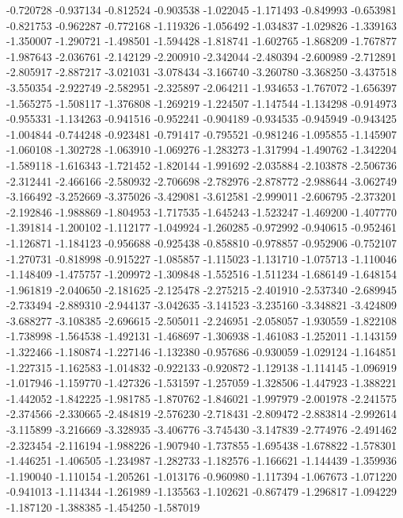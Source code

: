 -0.720728
-0.937134
-0.812524
-0.903538
-1.022045
-1.171493
-0.849993
-0.653981
-0.821753
-0.962287
-0.772168
-1.119326
-1.056492
-1.034837
-1.029826
-1.339163
-1.350007
-1.290721
-1.498501
-1.594428
-1.818741
-1.602765
-1.868209
-1.767877
-1.987643
-2.036761
-2.142129
-2.200910
-2.342044
-2.480394
-2.600989
-2.712891
-2.805917
-2.887217
-3.021031
-3.078434
-3.166740
-3.260780
-3.368250
-3.437518
-3.550354
-2.922749
-2.582951
-2.325897
-2.064211
-1.934653
-1.767072
-1.656397
-1.565275
-1.508117
-1.376808
-1.269219
-1.224507
-1.147544
-1.134298
-0.914973
-0.955331
-1.134263
-0.941516
-0.952241
-0.904189
-0.934535
-0.945949
-0.943425
-1.004844
-0.744248
-0.923481
-0.791417
-0.795521
-0.981246
-1.095855
-1.145907
-1.060108
-1.302728
-1.063910
-1.069276
-1.283273
-1.317994
-1.490762
-1.342204
-1.589118
-1.616343
-1.721452
-1.820144
-1.991692
-2.035884
-2.103878
-2.506736
-2.312441
-2.466166
-2.580932
-2.706698
-2.782976
-2.878772
-2.988644
-3.062749
-3.166492
-3.252669
-3.375026
-3.429081
-3.612581
-2.999011
-2.606795
-2.373201
-2.192846
-1.988869
-1.804953
-1.717535
-1.645243
-1.523247
-1.469200
-1.407770
-1.391814
-1.200102
-1.112177
-1.049924
-1.260285
-0.972992
-0.940615
-0.952461
-1.126871
-1.184123
-0.956688
-0.925438
-0.858810
-0.978857
-0.952906
-0.752107
-1.270731
-0.818998
-0.915227
-1.085857
-1.115023
-1.131710
-1.075713
-1.110046
-1.148409
-1.475757
-1.209972
-1.309848
-1.552516
-1.511234
-1.686149
-1.648154
-1.961819
-2.040650
-2.181625
-2.125478
-2.275215
-2.401910
-2.537340
-2.689945
-2.733494
-2.889310
-2.944137
-3.042635
-3.141523
-3.235160
-3.348821
-3.424809
-3.688277
-3.108385
-2.696615
-2.505011
-2.246951
-2.058057
-1.930559
-1.822108
-1.738998
-1.564538
-1.492131
-1.468697
-1.306938
-1.461083
-1.252011
-1.143159
-1.322466
-1.180874
-1.227146
-1.132380
-0.957686
-0.930059
-1.029124
-1.164851
-1.227315
-1.162583
-1.014832
-0.922133
-0.920872
-1.129138
-1.114145
-1.096919
-1.017946
-1.159770
-1.427326
-1.531597
-1.257059
-1.328506
-1.447923
-1.388221
-1.442052
-1.842225
-1.981785
-1.870762
-1.846021
-1.997979
-2.001978
-2.241575
-2.374566
-2.330665
-2.484819
-2.576230
-2.718431
-2.809472
-2.883814
-2.992614
-3.115899
-3.216669
-3.328935
-3.406776
-3.745430
-3.147839
-2.774976
-2.491462
-2.323454
-2.116194
-1.988226
-1.907940
-1.737855
-1.695438
-1.678822
-1.578301
-1.446251
-1.406505
-1.234987
-1.282733
-1.182576
-1.166621
-1.144439
-1.359936
-1.190040
-1.110154
-1.205261
-1.013176
-0.960980
-1.117394
-1.067673
-1.071220
-0.941013
-1.114344
-1.261989
-1.135563
-1.102621
-0.867479
-1.296817
-1.094229
-1.187120
-1.388385
-1.454250
-1.587019
